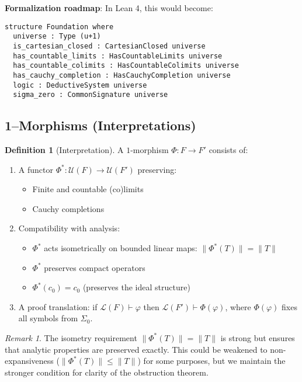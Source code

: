 \documentclass[11pt]{article}
\theoremstyle{definition}
\newtheorem{definition}[theorem]{Definition}
\theoremstyle{remark}
\newtheorem{remark}[theorem]{Remark}
\newcommand{\cnull}{c_0}
\begin{document}
\begin{mdframed}[style=roadmap]
\textbf{Formalization roadmap}: In Lean 4, this would become:
\begin{verbatim}
structure Foundation where
  universe : Type (u+1)
  is_cartesian_closed : CartesianClosed universe
  has_countable_limits : HasCountableLimits universe
  has_countable_colimits : HasCountableColimits universe
  has_cauchy_completion : HasCauchyCompletion universe
  logic : DeductiveSystem universe
  sigma_zero : CommonSignature universe
\end{verbatim}
\end{mdframed}

\subsection{1--Morphisms (Interpretations)}\label{ssec:Found-1mor}

\begin{definition}[Interpretation]\label{def:interpretation}
A \(1\)-morphism \(\Phi:F\to F'\) consists of:
\begin{enumerate}[label=\textnormal{(I\arabic*)}]
\item \label{I1a}
A functor \(\Phi^*:\mathcal U(F)\to\mathcal U(F')\) preserving:
  \begin{itemize}
  \item Finite and countable (co)limits
  \item Cauchy completions
  \end{itemize}
\item \label{I1b}
Compatibility with analysis: 
  \begin{itemize}
  \item \(\Phi^*\) acts isometrically on bounded linear maps: \(\|\Phi^*(T)\| = \|T\|\)
  \item \(\Phi^*\) preserves compact operators
  \item \(\Phi^*(\cnull) = \cnull\) (preserves the ideal structure)
  \end{itemize}
\item \label{I2}
A proof translation: if \(\mathcal L(F)\vdash\varphi\) then \(\mathcal L(F')\vdash \Phi(\varphi)\), where \(\Phi(\varphi)\) fixes all symbols from \(\Sigma_0\).
\end{enumerate}
\end{definition}

\begin{remark}
The isometry requirement \(\|\Phi^*(T)\| = \|T\|\) is strong but ensures that analytic properties are preserved exactly. This could be weakened to non-expansiveness (\(\|\Phi^*(T)\| \leq \|T\|\)) for some purposes, but we maintain the stronger condition for clarity of the obstruction theorem.
\end{remark}
\end{document}
